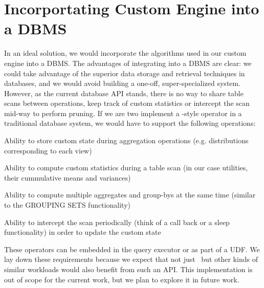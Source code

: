 \section{Incorportating Custom Engine into a DBMS}
\label{sec:incorporating}

In an ideal solution, we would incorporate the algorithms used in our custom
engine into a DBMS. 
The advantages of integrating into a DBMS are clear: we could take advantage of
the superior data storage and retrieval techniques in databases, and we would
avoid building a one-off, super-specialized system.
However, as the current database API stands, there is no way to share table
scans between operations, keep track of custom statistics or intercept the scan
mid-way to perform pruning.
If we are two implement a \VizRecDB-style operator in a traditional database
system, we would have to support the following operations:
\squishlist
\item Ability to store custom state during aggregation operations (e.g.
distributions corresponding to each view)
\item Ability to compute custom statistics during a table scan (in our case
utilities, their cummulative means and variances)
\item Ability to compute multiple aggregates and group-bys at the same time
(similar to the GROUPING SETS functionality)
\item Ability to intercept the scan periodically (think of a call back or a
sleep functionality) in order to update the custom state
\squishend

These operators can be embedded in the query executor or as part of a UDF.
We lay down these requirements because we expect that not just \VizRecDB\ but
other kinds of similar workloads would also benefit from such an API.
This implementation is out of scope for the current work, but we plan to explore
it in future work.


